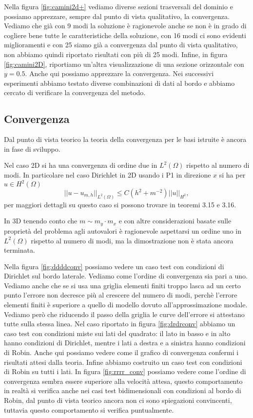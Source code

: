 Nella figura \ref{fig:camini2d+} vediamo diverse sezioni trasversali del dominio e possiamo apprezzare, sempre dal punto di vista qualitativo,
la convergenza. Vediamo che gi\`a con 9 modi la soluzione \`e ragionevole anche se non \`e in grado di cogliere 
bene tutte le caratteristiche della soluzione, con 16 modi ci sono evidenti miglioramenti e con 25 siamo gi\`a a convergenza dal punto di 
vista qualitativo, non abbiamo quindi riportato risultati con pi\`u di 25 modi.
Infine, in figura \ref{fig:camini2D}, riportiamo un'altra visualizzazione di una sezione orizzontale con $y=0.5$.
Anche qui possiamo apprezzare la convergenza.
Nei successivi esperimenti abbiamo testato diverse combinazioni di dati al bordo e abbiamo cercato di verificare la convergenza del 
metodo. 
\subsection*{Convergenza}
Dal punto di vista teorico la teoria della convergenza per le basi istruite \`e ancora in fase di sviluppo.

Nel caso 2D si ha una convergenza di ordine due in $L^2(\Omega)$ rispetto al numero di modi.
In particolare nel caso Dirichlet in 2D usando i P1 in direzione $x$ si ha per $u\in H^2(\Omega)$
\begin{equation}
 \label{eq:stimainl2}
 ||u-u_{m,h}||_{L^2(\Omega)}\leq C ( h^2+m^{-2}) ||u||_{H^2},
\end{equation}
per maggiori dettagli su questo caso si possono trovare in \cite{zilio:himod} teoremi 3.15 e 3.16.

In 3D tenendo conto che $m\sim m_y\cdot m_x$ e con altre considerazioni basate sulle propriet\`a del problema agli autovalori
\`e ragionevole aspettarsi un ordine uno in $L^2(\Omega)$ rispetto al numero di modi, ma la dimostrazione 
non \`e stata ancora terminata.

Nella figura \ref{fig:ddddconv} possiamo vedere un caso test con condizioni di Dirichlet sul bordo laterale. Vediamo 
come l'ordine di convergenza sia pari a uno. Vediamo anche che se si usa una griglia elementi finiti troppo 
lasca ad un certo punto l'errore non decresce pi\`u al crescere del numero di modi, perch\`e 
l'errore elementi finiti \`e superiore a quello di modello dovuto all'approssimazione modale.
Vediamo per\`o che riducendo il passo della griglia le curve dell'errore si attestano tutte sulla stessa linea.
Nel caso riportato in figura \ref{fig:drdrconv} abbiamo un caso test con condizioni miste sui lati del quadrato:
il lato in basso e in alto hanno condizioni di Dirichlet, mentre i lati a destra e a sinistra hanno condizioni di Robin.
Anche qui possiamo vedere come il grafico di convergenza confermi i risultati attesi dalla teoria.
Infine abbiamo costruito un caso test con condizioni di Robin su tutti i lati. In figura \ref{fig:rrrr_conv} possiamo 
vedere come l'ordine di convergenza sembra essere superiore alla velocit\`a attesa, questo comportamento in realt\`a 
si verifica anche nei casi test bidimensionali con condizioni al bordo di Robin, dal punto di vista teorico ancora non ci sono 
spiegazioni convincenti, tuttavia questo comportamento si verifica puntualmente.

